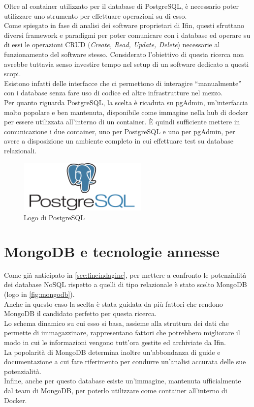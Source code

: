 \noindent Oltre al container utilizzato per il database di PostgreSQL, è necessario poter utilizzare uno strumento per effettuare operazioni su di esso.\\
Come spiegato in fase di analisi dei software proprietari di Ifin, questi sfruttano diversi framework e paradigmi per poter comunicare con i database ed operare su di essi le \gls{operazioni CRUD} (\textit{Create, Read, Update, Delete}) necessarie al funzionamento del software stesso. Considerato l'obiettivo di questa ricerca non avrebbe tuttavia senso investire tempo nel setup di un software dedicato a questi scopi.\\
Esistono infatti delle interfacce che ci permettono di interagire ``manualmente'' con i database senza fare uso di codice ed altre infrastrutture nel mezzo.\\
Per quanto riguarda PostgreSQL, la scelta è ricaduta su pgAdmin, un'interfaccia molto popolare e ben mantenuta, disponibile come immagine nella hub di docker per essere utilizzata all'interno di un container. È quindi sufficiente mettere in comunicazione i due container, uno per PostgreSQL e uno per pgAdmin, per avere a disposizione un ambiente completo in cui effettuare test su database relazionali.

\begin{figure}[htbp]
\begin{center}
\includegraphics[height=7em]{immagini/tecnologies-logos/postgresql-logo.png}
\caption{Logo di PostgreSQL}
\label{fig:postgresql}
\end{center}
\end{figure}

\section{MongoDB e tecnologie annesse}
Come già anticipato in \autoref{sec:fineindagine}, per mettere a confronto le potenzialità dei database NoSQL rispetto a quelli di tipo relazionale è stato scelto MongoDB (logo in \autoref{fig:mongodb}).\\
Anche in questo caso la scelta è stata guidata da più fattori che rendono MongoDB il candidato perfetto per questa ricerca.\\
Lo schema dinamico su cui esso si basa, assieme alla struttura dei dati che permette di immagazzinare, rappresentano fattori che potrebbero migliorare il modo in cui le informazioni vengono tutt'ora gestite ed archiviate da Ifin.\\
La popolarità di MongoDB determina inoltre un'abbondanza di guide e documentazione a cui fare riferimento per condurre un'analisi accurata delle sue potenzialità.\\
Infine, anche per questo database esiste un'immagine, mantenuta ufficialmente dal team di MongoDB, per poterlo utilizzare come container all'interno di Docker.\\


